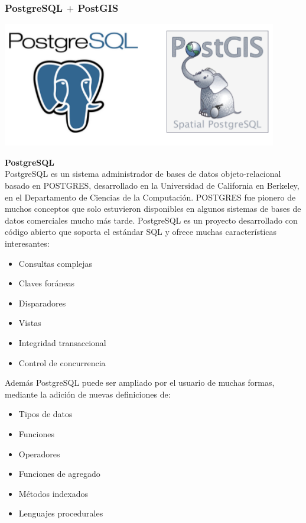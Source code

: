 \documentclass[a4paper,12pt,oneside]{report}
\begin{document}
\subsubsection*{PostgreSQL $+$ PostGIS}
\begin{center}
\includegraphics[scale=0.3]{Imagenes/23.png}
\end{center}
\textbf{PostgreSQL}\\
PostgreSQL es un sistema administrador
 de bases de datos objeto-relacional 
basado en POSTGRES, desarrollado en la Universidad de California 
en Berkeley, en el Departamento de Ciencias de la Computación. POSTGRES fue 
pionero de muchos conceptos que solo estuvieron disponibles en algunos 
sistemas de bases de datos comerciales mucho más tarde. 
PostgreSQL es un proyecto desarrollado
 con código abierto que soporta el 
estándar SQL y ofrece muchas características interesantes: 

\begin{itemize}
\item Consultas complejas
\item Claves for\'aneas
\item Disparadores
\item Vistas
\item Integridad transaccional
\item Control de concurrencia
\end{itemize}

Adem\'as PostgreSQL puede ser ampliado 
por el usuario de muchas formas,
mediante la adici\'on de nuevas definiciones de: 

\begin{itemize}
\item Tipos de datos
\item Funciones
\item Operadores
\item Funciones de agregado
\item M\'etodos indexados
\item Lenguajes procedurales
\end{itemize}
\end{document}
